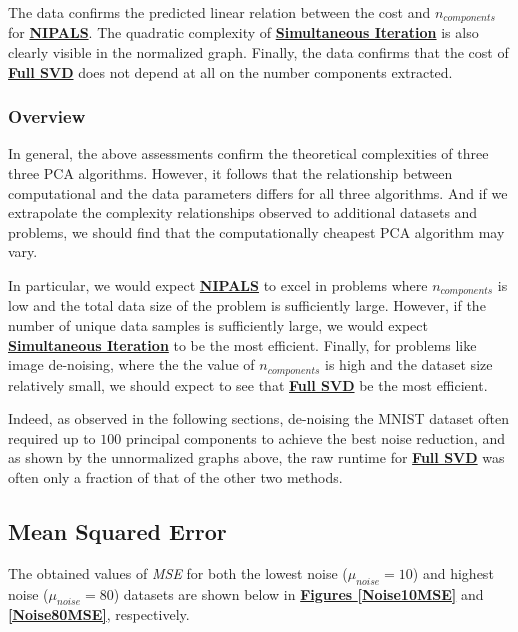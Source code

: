 \documentclass[12pt]{article}
\begin{document}
The data confirms the predicted linear relation between the cost and $n_{components}$ for \textbf{\hyperref[3.1]{NIPALS}}. The quadratic complexity of \textbf{\hyperref[3.3]{Simultaneous Iteration}} is also clearly visible in the normalized graph. Finally, the data confirms that the cost of \textbf{\hyperref[3.2]{Full SVD}} does not depend at all on the number components extracted.

\subsubsection{Overview}\label{5.1.5}

In general, the above assessments confirm the theoretical complexities of three three PCA algorithms. However, it follows that the relationship between computational and the data parameters differs for all three algorithms. And if we extrapolate the complexity relationships observed to additional datasets and problems, we should find that the computationally cheapest PCA algorithm may vary. 

In particular, we would expect \textbf{\hyperref[3.1]{NIPALS}} to excel in problems where $n_{components}$ is low and the total data size of the problem is sufficiently large. However, if the number of unique data samples is sufficiently large, we would expect \textbf{\hyperref[3.3]{Simultaneous Iteration}} to be the most efficient. Finally, for problems like image de-noising, where the the value of $n_{components}$ is high and the dataset size relatively small, we should expect to see that \textbf{\hyperref[3.2]{Full SVD}} be the most efficient.

Indeed, as observed in the following sections, de-noising the MNIST dataset often required up to $100$ principal components to achieve the best noise reduction, and as shown by the unnormalized graphs above, the raw runtime for \textbf{\hyperref[3.2]{Full SVD}} was often only a fraction of that of the other two methods. 

\subsection{Mean Squared Error}\label{5.2}

The obtained values of \textit{MSE} for both the lowest noise ($\mu_{noise}=10$) and highest noise ($\mu_{noise}=80$) datasets are shown below in \textbf{\hyperref[Noise10MSE]{Figures \ref*{Noise10MSE}}} and \textbf{\hyperref[Noise80MSE]{\ref*{Noise80MSE}}}, respectively.
\end{document}

